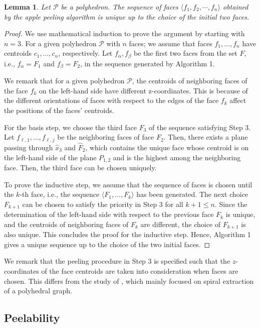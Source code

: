\documentclass[]{interact}
\theoremstyle{plain}%
\newtheorem{lemma}[theorem]{Lemma}
\theoremstyle{definition}
\theoremstyle{remark}
\begin{document}
\begin{lemma}
    Let $\mathcal{P}$ be a polyhedron. The sequence of faces $\langle f_1, f_2, \cdots, f_n\rangle$ obtained by the apple peeling algorithm is unique up to the choice of the initial two faces.
\end{lemma}
\begin{proof}
    We use mathematical induction to prove the argument by starting with $n=3$. For a given polyhedron $\mathcal{P}$ with $n$ faces; we assume that faces $f_1, ..., f_n$ have centroids $c_1, ..., c_n$, respectively. Let $f_{\alpha}, f_{\beta}$ be the first two faces from the set $F$, i.e., $f_{\alpha}=F_1$ and $f_{\beta}=F_2$, in the sequence generated by Algorithm 1.

    We remark that for a given polyhedron $\mathcal{P}$, the centroids of neighboring faces of the face $f_k$ on the left-hand side have different z-coordinates. This is because of the different orientations of faces with respect to the edges of the face $f_k$ affect the positions of the faces' centroids.
    
    For the basis step, we choose the third face $F_3$ of the sequence satisfying Step 3. Let $f_{\ell,1},..., f_{\ell,j}$ be the neighboring faces of face $F_2$. Then, there exists a plane passing through $\hat{x}_3$ and $\hat{F}_2$, which contains the unique face whose centroid is on the left-hand side of the plane $P_{1,2}$ and is the highest among the neighboring face. Then, the third face can be chosen uniquely.

    To prove the inductive step, we assume that the sequence of faces is chosen until the $k$-th face, i.e., the sequence $\langle F_1, ..., F_k\rangle$ has been generated. The next choice $F_{k+1}$ can be chosen to satisfy the priority in Step 3 for all $k+1\leq n$. Since the determination of the left-hand side with respect to the previous face $F_k$ is unique, and the centroids of neighboring faces of $F_k$ are different, the choice of $F_{k+1}$ is also unique. This concludes the proof for the inductive step. Hence, Algorithm 1 gives a unique sequence up to the choice of the two initial faces.
\end{proof}

We remark that the peeling procedure in Step 3 is specified such that the $z$-coordinates of the face centroids are taken into consideration  when faces are chosen. This differs from the study of \cite{WSA2018}, which mainly focused on spiral extraction of a polyhedral graph.


\subsection{Peelability}
\end{document}
